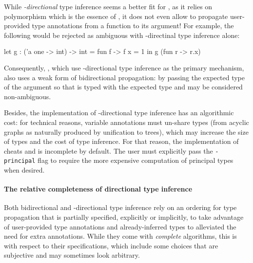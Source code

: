 \documentclass[acmsmall,screen,nonacm]{acmart}
\begin{document}
While \emph{\Geninst-directional} type inference seems a better fit for \ML,
as it relies on polymorphism which is the essence of \ML, it does not even
allow to propagate user-provided type annotations from a function to its
argument!  For example, the following would be rejected as ambiguous with
\geninst-directinal type inference alone:
\begin{program}[input]
let g : ('a one -> int) -> int = fun f -> f {x = 1} in g (fun r -> r.x)
\end{program}
Consequently, \OCaml, which use \geninst-directional type inference as the
primary mechanism, also uses a weak form of bidirectional propagation: by
passing the expected type of the argument so that
 is typed with the expected type
 and may be considered non-ambiguous.

Besides, the implementation of \geninst-directional type inference has an
algorithmic cost: for technical reasons, variable annotations must un-share
types (from acyclic graphs as naturally produced by unification to trees),
which may increase the size of types and the cost of type inference. For
that reason, the implementation of \OCaml cheats and is incomplete by
default. The user must explicitly pass the \texttt{-principal} flag to
require the more expensive computation of principal types when desired.

\paragraph{The relative completeness of directional type inference}

Both bidirectional and \geninst-directional type inference rely on an
ordering for type propagation that is partially specified, explicitly or
implicitly, to take advantage of user-provided type annotations and
already-inferred types to alleviated the need for extra annotations.
%
While they come with \emph{complete} algorithms, this is with respect to
their specifications, which include some choices that are subjective and may
sometimes look arbitrary.

\locallabelreset
\end{document}
